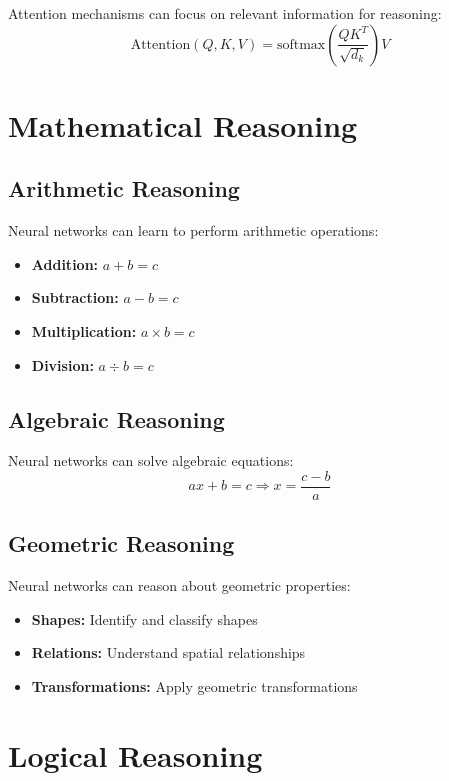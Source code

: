 Attention mechanisms can focus on relevant information for reasoning:
\begin{equation}
    \text{Attention}(Q, K, V) = \text{softmax}\left(\frac{QK^T}{\sqrt{d_k}}\right)V
\end{equation}

\section{Mathematical Reasoning}

\subsection{Arithmetic Reasoning}

Neural networks can learn to perform arithmetic operations:
\begin{itemize}
    \item \textbf{Addition:} $a + b = c$
    \item \textbf{Subtraction:} $a - b = c$
    \item \textbf{Multiplication:} $a \times b = c$
    \item \textbf{Division:} $a \div b = c$
\end{itemize}

\subsection{Algebraic Reasoning}

Neural networks can solve algebraic equations:
\begin{equation}
    ax + b = c \Rightarrow x = \frac{c - b}{a}
\end{equation}

\subsection{Geometric Reasoning}

Neural networks can reason about geometric properties:
\begin{itemize}
    \item \textbf{Shapes:} Identify and classify shapes
    \item \textbf{Relations:} Understand spatial relationships
    \item \textbf{Transformations:} Apply geometric transformations
\end{itemize}

\section{Logical Reasoning}

